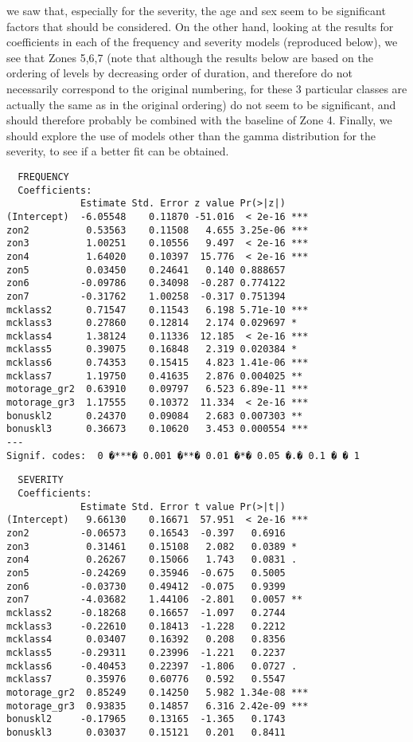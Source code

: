 \documentclass[11pt]{article}
\begin{document}
\begin{enumerate}
   we saw that, especially for the severity, the age and sex seem to be significant factors that should be considered. On the other hand, looking at the results for coefficients in each of the frequency and severity models (reproduced below), we see that Zones 5,6,7 (note that although the results below are based on the ordering of levels by decreasing order of duration, and therefore do not necessarily correspond to the original numbering, for these 3 particular classes are actually the same as in the original ordering) do not seem to be significant, and should therefore probably be combined with the baseline of Zone 4. Finally, we should explore the use of models other than the gamma distribution for the severity, to see if a better fit can be obtained.
  
  \begin{verbatim}
  FREQUENCY
  Coefficients:
             Estimate Std. Error z value Pr(>|z|)    
(Intercept)  -6.05548    0.11870 -51.016  < 2e-16 ***
zon2          0.53563    0.11508   4.655 3.25e-06 ***
zon3          1.00251    0.10556   9.497  < 2e-16 ***
zon4          1.64020    0.10397  15.776  < 2e-16 ***
zon5          0.03450    0.24641   0.140 0.888657    
zon6         -0.09786    0.34098  -0.287 0.774122    
zon7         -0.31762    1.00258  -0.317 0.751394    
mcklass2      0.71547    0.11543   6.198 5.71e-10 ***
mcklass3      0.27860    0.12814   2.174 0.029697 *  
mcklass4      1.38124    0.11336  12.185  < 2e-16 ***
mcklass5      0.39075    0.16848   2.319 0.020384 *  
mcklass6      0.74353    0.15415   4.823 1.41e-06 ***
mcklass7      1.19750    0.41635   2.876 0.004025 ** 
motorage_gr2  0.63910    0.09797   6.523 6.89e-11 ***
motorage_gr3  1.17555    0.10372  11.334  < 2e-16 ***
bonuskl2      0.24370    0.09084   2.683 0.007303 ** 
bonuskl3      0.36673    0.10620   3.453 0.000554 ***
---
Signif. codes:  0 �***� 0.001 �**� 0.01 �*� 0.05 �.� 0.1 � � 1
  \end{verbatim}
  
   \begin{verbatim}
  SEVERITY
  Coefficients:
             Estimate Std. Error t value Pr(>|t|)    
(Intercept)   9.66130    0.16671  57.951  < 2e-16 ***
zon2         -0.06573    0.16543  -0.397   0.6916    
zon3          0.31461    0.15108   2.082   0.0389 *  
zon4          0.26267    0.15066   1.743   0.0831 .  
zon5         -0.24269    0.35946  -0.675   0.5005    
zon6         -0.03730    0.49412  -0.075   0.9399    
zon7         -4.03682    1.44106  -2.801   0.0057 ** 
mcklass2     -0.18268    0.16657  -1.097   0.2744    
mcklass3     -0.22610    0.18413  -1.228   0.2212    
mcklass4      0.03407    0.16392   0.208   0.8356    
mcklass5     -0.29311    0.23996  -1.221   0.2237    
mcklass6     -0.40453    0.22397  -1.806   0.0727 .  
mcklass7      0.35976    0.60776   0.592   0.5547    
motorage_gr2  0.85249    0.14250   5.982 1.34e-08 ***
motorage_gr3  0.93835    0.14857   6.316 2.42e-09 ***
bonuskl2     -0.17965    0.13165  -1.365   0.1743    
bonuskl3      0.03037    0.15121   0.201   0.8411    
\end{verbatim}
\end{enumerate}
\end{document}
